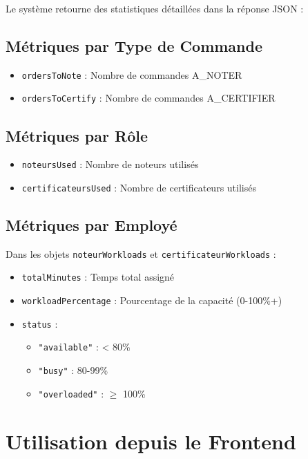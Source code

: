 \documentclass[11pt,a4paper]{article}
\begin{document}
    Le système retourne des statistiques détaillées dans la réponse JSON :

    \subsection{Métriques par Type de Commande}

    \begin{itemize}
        \item \texttt{ordersToNote} : Nombre de commandes A\_NOTER
        \item \texttt{ordersToCertify} : Nombre de commandes A\_CERTIFIER
    \end{itemize}

    \subsection{Métriques par Rôle}

    \begin{itemize}
        \item \texttt{noteursUsed} : Nombre de noteurs utilisés
        \item \texttt{certificateursUsed} : Nombre de certificateurs utilisés
    \end{itemize}

    \subsection{Métriques par Employé}

    Dans les objets \texttt{noteurWorkloads} et \texttt{certificateurWorkloads} :

    \begin{itemize}
        \item \texttt{totalMinutes} : Temps total assigné
        \item \texttt{workloadPercentage} : Pourcentage de la capacité (0-100\%+)
        \item \texttt{status} :
        \begin{itemize}
            \item \texttt{"available"} : < 80\%
            \item \texttt{"busy"} : 80-99\%
            \item \texttt{"overloaded"} : $\geq$ 100\%
        \end{itemize}
    \end{itemize}

    \section{Utilisation depuis le Frontend}
\end{document}
